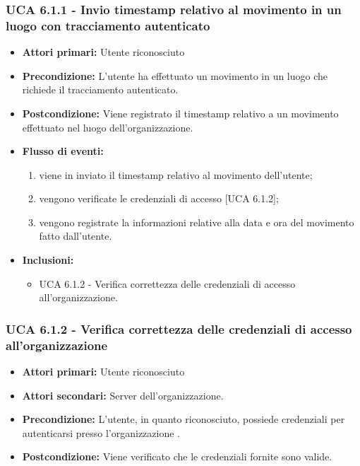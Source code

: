 \subsubsection{UCA 6.1.1 - Invio timestamp relativo al movimento in un luogo con tracciamento autenticato}
\begin{itemize}
	\item \textbf{Attori primari:} Utente riconosciuto
	\item \textbf{Precondizione:} L'utente ha effettuato un movimento in un luogo che richiede il tracciamento autenticato.
	\item \textbf{Postcondizione:} Viene registrato il timestamp relativo a un movimento effettuato nel luogo dell'organizzazione.
	\item \textbf{Flusso di eventi:}
		\begin{enumerate}
			\item viene in inviato il timestamp relativo al movimento dell'utente;
			\item vengono verificate le credenziali di accesso [UCA 6.1.2];
			\item vengono registrate la informazioni relative alla data e ora del movimento fatto dall'utente.
		\end{enumerate}
	\item \textbf{Inclusioni:}
		\begin{itemize}
			\item UCA 6.1.2 - Verifica correttezza delle credenziali di accesso all'organizzazione.
		\end{itemize}
\end{itemize}

\subsubsection{UCA 6.1.2 - Verifica correttezza delle credenziali di accesso all'organizzazione}
\begin{itemize}
	\item \textbf{Attori primari:} Utente riconosciuto
	\item \textbf{Attori secondari:} Server dell'organizzazione.
	\item \textbf{Precondizione:} L'utente, in quanto riconosciuto, possiede credenziali per autenticarsi presso l'organizzazione .
	\item \textbf{Postcondizione:} Viene verificato che le credenziali fornite sono valide.
\end{itemize}

